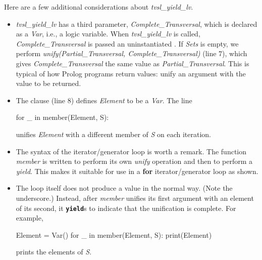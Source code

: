 Here are a few additional considerations about  \textit{tvsl\_yield\_lv}.
\begin{itemize}
\item  \textit{tvsl\_yield\_lv} has a third parameter, \textit{Complete\_Transversal}, which is declared as a \textit{Var}, i.e., a logic variable. When \textit{tvsl\_yield\_lv} is called, \textit{Complete\_Transversal} is passed an uninstantiated . If \textit{Sets} is empty, we perform \textit{unify(Partial\_Transversal, Complete\_Transversal)} (line 7), which gives \textit{Complete\_Transversal} the same value as \textit{Partial\_Transversal}. This is typical of how Prolog programs return values: unify an argument with the value to be returned.
\item The  clause (line 8) defines \textit{Element} to be a \textit{Var}. The line 
    \begin{python}
        for _ in member(Element, S):
    \end{python}
    unifies \textit{Element} with a different member of \textit{S} on each iteration. 
\item The syntax of the  iterator/generator loop is worth a remark. The function \textit{member} is written to perform its own \textit{unify} operation and then to perform a \textit{yield}. This makes it suitable for use in a \textbf{for} iterator/generator loop as shown. 

\item The  loop itself does not produce a value in the normal way. (Note the underscore.) Instead, after \textit{member} unifies its first argument with an element of its second, it \texttt{\textbf{yield}}s to indicate that the unification is complete. For example, 
\begin{python}
Element = Var()
for _ in member(Element, S):
  print(Element)
\end{python}
prints the elements of \textit{S}.
\smallv


\end{itemize}
